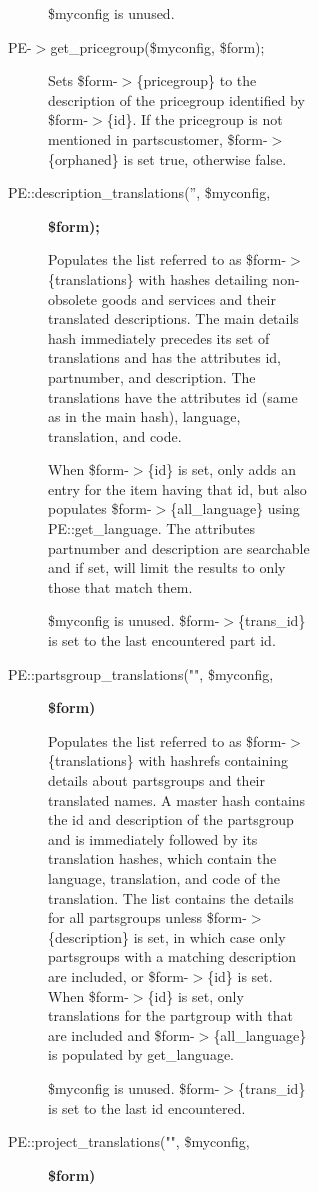 \begin{description}
\begin{description}
\begin{description}
\begin{description}
\begin{description}
\begin{description}
\$myconfig is unused.


\item[{PE-$>$get\_pricegroup(\$myconfig, \$form);}] \mbox{}

Sets \$form-$>$\{pricegroup\} to the description of the pricegroup identified by
\$form-$>$\{id\}.  If the pricegroup is not mentioned in partscustomer,
\$form-$>$\{orphaned\} is set true, otherwise false.


\item[{PE::description\_translations('', \$myconfig,}] \textbf{\$form);}

Populates the list referred to as \$form-$>$\{translations\} with hashes detailing
non-obsolete goods and services and their translated descriptions.  The main
details hash immediately precedes its set of translations and has the
attributes id, partnumber, and description.  The translations have the
attributes id (same as in the main hash), language, translation, and code.



When \$form-$>$\{id\} is set, only adds an entry for the item having that id, but
also populates \$form-$>$\{all\_language\} using PE::get\_language.  The attributes
partnumber and description are searchable and if set, will limit the results to
only those that match them.



\$myconfig is unused.  \$form-$>$\{trans\_id\} is set to the last encountered part id.


\item[{PE::partsgroup\_translations("", \$myconfig,}] \textbf{\$form)}

Populates the list referred to as \$form-$>$\{translations\} with hashrefs containing
details about partsgroups and their translated names.  A master hash contains
the id and description of the partsgroup and is immediately followed by its
translation hashes, which  contain the language, translation, and code of the
translation.  The list contains the details for all partsgroups unless
\$form-$>$\{description\} is set, in which case only partsgroups with a matching
description are included, or \$form-$>$\{id\} is set.  When \$form-$>$\{id\} is set, only
translations for the partgroup with that are included and \$form-$>$\{all\_language\}
is populated by get\_language.



\$myconfig is unused.  \$form-$>$\{trans\_id\} is set to the last id encountered.


\item[{PE::project\_translations("", \$myconfig,}] \textbf{\$form)}


\end{description}
\end{description}
\end{description}
\end{description}
\end{description}
\end{description}
